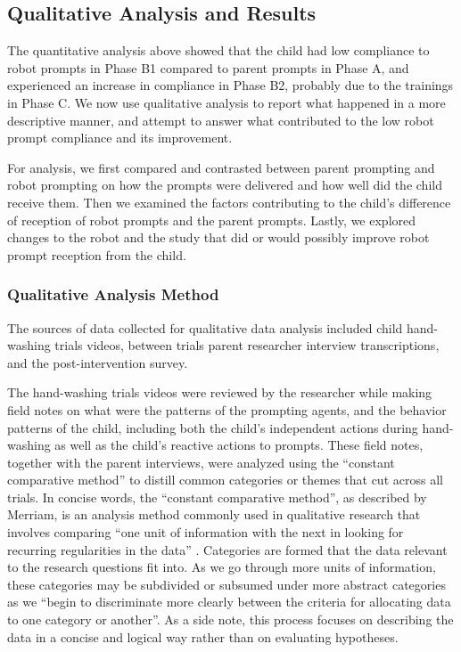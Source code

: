 \documentclass{ut-thesis}
\begin{document}
\subsection{Qualitative Analysis and Results}
\label{sec:QualitativeData_results}
The quantitative analysis above showed that the child had low compliance to robot prompts in Phase B1 compared to parent prompts in Phase A, and experienced an increase in compliance in Phase B2, probably due to the trainings in Phase C.  We now use qualitative analysis to report what happened in a more descriptive manner, and attempt to answer what contributed to the low robot prompt compliance and its improvement.

For analysis, we first compared and contrasted between parent prompting and robot prompting on how the prompts were delivered and how well did the child receive them.  Then we examined the factors contributing to the child's difference of reception of robot prompts and the parent prompts.  Lastly, we explored changes to the robot and the study that did or would possibly improve robot prompt reception from the child.

\subsubsection{Qualitative Analysis Method}
The sources of data collected for qualitative data analysis included child hand-washing trials videos, between trials parent researcher interview transcriptions, and the post-intervention survey.

The hand-washing trials videos were reviewed by the researcher while making field notes on what were the patterns of the prompting agents, and the behavior patterns of the child, including both the child's independent actions during hand-washing as well as the child's reactive actions to prompts.  These field notes, together with the parent interviews, were analyzed using the ``constant comparative method'' to distill common categories or themes that cut across all trials.  In concise words, the ``constant comparative method'', as described by Merriam, is an analysis method commonly used in qualitative research that involves comparing ``one unit of information with the next in looking for recurring regularities in the data'' \cite{merriam2014qualitative}.  Categories are formed that the data relevant to the research questions fit into.  As we go through more units of information, these categories may be subdivided or subsumed under more abstract categories as we ``begin to discriminate more clearly between the criteria for allocating data to one category or another''.  As a side note, this process focuses on describing the data in a concise and logical way rather than on evaluating hypotheses.
\end{document}
